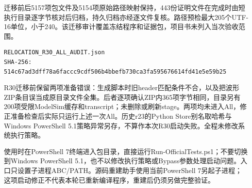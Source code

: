 \documentclass[UTF8,fontset=fandol,12pt]{ctexart}
\begin{document}
迁移前后5157项包文件及5154项原始路径映射保持，443份证明文件在完成时由短执行目录逐字节核对后归档，持久归档亦经逐文件复核。路径预检最大205个UTF-16单位，小于240。该迁移审计覆盖冻结程序和证据包，项目书未列入当次验收范围。

{\small
\noindent\begin{minipage}{\linewidth}
\begin{verbatim}
RELOCATION_R30_ALL_AUDIT.json
SHA-256:
514c67ad3dff78a6faccc9cdf506b4bbefb730ca3fa595676614fd41e5e59b25
\end{verbatim}
\end{minipage}
\par}
R30迁移前保留两项准备错误：生成脚本时旧header匹配条件不合，以及把波形ZIP条目误当成原目录文件全集。后者逐项确认ZIP内365项字节相同，目录另有200项受限ModelSim缓存和transcript；未删除或刷新stage。两项均未进入All，修正准备检查后实际只运行上述一次All。历史r23的Python Store别名取哈希与Windows PowerShell 5.1策略异常另存，不算作本次R30启动失败。全程未修改系统执行策略。

使用时在PowerShell 7终端进入包目录，直接运行Run-OfficialTests.ps1；不要切换到Windows PowerShell 5.1，也不以修改执行策略或Bypass参数处理启动问题。入口只设置子进程ABC/\allowbreak{}PATH。源码重建助手使用当前PowerShell 7另起子进程；这项启动修正不代表本轮已重新编译程序，重建后仍须另做完整验证。
\end{document}
